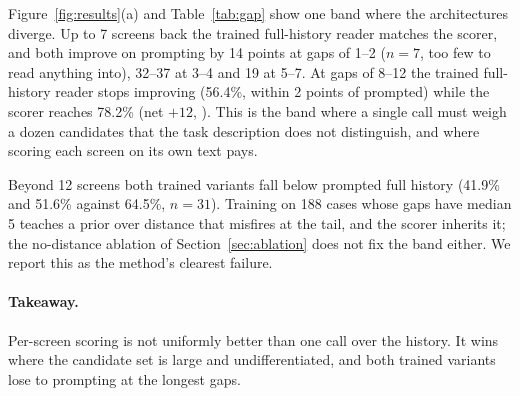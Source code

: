 \begin{table}[t]
\centering\footnotesize\setlength{\tabcolsep}{4pt}
\caption{Localization (\%) by gap, 188 cases. The trained variants are level except at gaps of 8--12 screens. At gaps of 13 or more both fall below prompted full history.}
\label{tab:gap}
\end{table}

Figure~\ref{fig:results}(a) and Table~\ref{tab:gap} show one band where the architectures diverge. Up to 7 screens back the trained full-history reader matches the scorer, and both improve on prompting by 14 points at gaps of 1--2 ($n=7$, too few to read anything into), 32--37 at 3--4 and 19 at 5--7. At gaps of 8--12 the trained full-history reader stops improving (56.4\%, within 2 points of prompted) while the scorer reaches 78.2\% (net $+12$, ). This is the band where a single call must weigh a dozen candidates that the task description does not distinguish, and where scoring each screen on its own text pays.

Beyond 12 screens both trained variants fall below prompted full history (41.9\% and 51.6\% against 64.5\%, $n=31$). Training on 188 cases whose gaps have median 5 teaches a prior over distance that misfires at the tail, and the scorer inherits it; the no-distance ablation of Section~\ref{sec:ablation} does not fix the band either. We report this as the method's clearest failure.

\paragraph{Takeaway.} Per-screen scoring is not uniformly better than one call over the history. It wins where the candidate set is large and undifferentiated, and both trained variants lose to prompting at the longest gaps.

